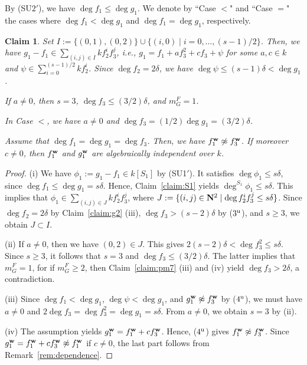 \documentclass{amsart}
\theoremstyle{plain}
\newtheorem{claim}{Claim}
\theoremstyle{definition}
\newcommand{\nd}{\noindent}
\newcommand{\N}{{\bf N}}
\newcommand{\w}{{\bf w}}
\begin{document}
By (SU$2'$), we have $\deg f_1\le \deg g_1$. 
We denote by ``Case $<$" and ``Case $=$" 
the cases where $\deg f_1<\deg g_1$ and $\deg f_1=\deg g_1$, 
respectively. 


\begin{claim}\label{claim:g1}
\nd{\rm (i)} 
Set $I:=\{ (0,1),(0,2)\} \cup \{ (i,0)\mid 
i=0,\ldots ,(s-1)/2\} $. 
Then, we have $g_1-f_1\in \sum _{(i,j)\in I}kf_2^if_3^j$, 
i.e., 
$g_1=f_1+af_3^2+cf_3+\psi $ for some 
$a,c\in k$ and $\psi \in \sum _{i=0}^{(s-1)/2}kf_2^i$. 
Since $\deg f_2=2\delta $, 
we have $\deg \psi \le (s-1)\delta <\deg g_1$. 



\nd{\rm (ii)} 
If $a\ne 0$, 
then $s=3$, $\deg f_3\le (3/2)\delta $, and $m_G^F=1$. 


\nd{\rm (iii)} 
In Case $<$, we have $a\ne 0$ and $\deg f_3=(1/2)\deg g_1=(3/2)\delta $. 


\nd{\rm (iv)} 
Assume that $\deg f_1=\deg g_1=\deg f_3$. 
Then, we have $f_1^{\w }\not\approx f_3^{\w }$. 
If moreover $c\ne 0$, 
then $f_1^{\w }$ and $g_1^{\w }$ are algebraically independent over $k$. 


\end{claim}
\begin{proof}
(i) 
We have 
$\phi _1:=g_1-f_1\in k[S_1]$ by (SU1$'$). 
It satisfies $\deg \phi _1\le s\delta $, 
since $\deg f_1\le \deg g_1=s\delta $. 
Hence, Claim~\ref{claim:S1} yields $\deg ^{S_1}\phi _1\le s\delta $. 
This implies that $\phi _1\in \sum _{(i,j)\in J}kf_2^if_3^j$, 
where $J:=\{ (i,j)\in \N ^2\mid \deg f_2^if_3^j\le s\delta \} $. 
Since $\deg f_2=2\delta $ 
by Claim~\ref{claim:g2} (iii), 
$\deg f_3>(s-2)\delta $ by ($3^{\rm u}$), 
and $s\ge 3$, 
we obtain $J\subset I$. 


(ii) 
If $a\ne 0$, then we have $(0,2)\in J$. 
This gives 
$2(s-2)\delta <\deg f_3^2\le s\delta $. 
Since $s\ge 3$, 
it follows that $s=3$ and $\deg f_3\le (3/2)\delta $. 
The latter implies that $m_G^F=1$, 
for if $m_G^F\ge 2$, 
then Claim~\ref{claim:pm7} (iii) and (iv) 
yield $\deg f_3>2\delta $, 
a contradiction. 



(iii) 
Since $\deg f_1<\deg g_1$, 
$\deg \psi <\deg g_1$, 
and $g_1^{\w }\not\approx f_3^{\w }$ by ($4^{\rm u}$), 
we must have 
$a\ne 0$ and $2\deg f_3=\deg f_3^2=\deg g_1=s\delta $. 
From $a\ne 0$, 
we obtain $s=3$ by (ii). 



(iv) 
The assumption yields $g_1^{\w }=f_1^{\w }+cf_3^{\w }$. 
Hence, ($4^{\rm u}$) gives $f_1^{\w }\not\approx f_3^{\w }$. 
Since $g_1^{\w }=f_1^{\w }+cf_3^{\w }\not\approx f_1^{\w }$ if $c\ne 0$, 
the last part follows from Remark~\ref{rem:dependence}. 
\end{proof}
\end{document}
